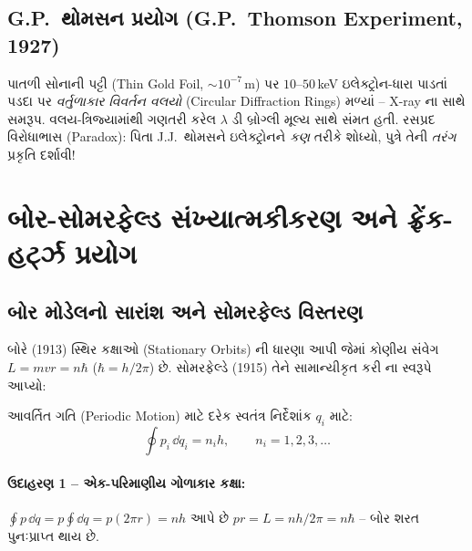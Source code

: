 \subsection{G.P.\ થોમસન પ્રયોગ (G.P.\ Thomson Experiment, 1927)}

પાતળી સોનાની પટ્ટી (Thin Gold Foil, $\sim10^{-7}\,$m) પર $10$--$50\,$keV ઇલેક્ટ્રોન-ધારા
પાડતાં પડદા પર \emph{વર્તુળાકાર વિવર્તન વલયો} (Circular Diffraction Rings) મળ્યાં -- X-ray ના
 સાથે સમરૂપ. વલય-ત્રિજ્યામાંથી ગણતરી કરેલ $\lambda$ ડી બ્રોગ્લી
મૂલ્ય સાથે સંમત હતી. રસપ્રદ વિરોધાભાસ (Paradox): પિતા J.J.\ થોમસને ઇલેક્ટ્રોનને \emph{કણ}
તરીકે શોધ્યો, પુત્રે તેની \emph{તરંગ} પ્રકૃતિ દર્શાવી!

\section{બોર-સોમરફેલ્ડ સંખ્યાત્મકીકરણ અને ફ્રેંક-હર્ટ્ઝ પ્રયોગ}

\subsection{બોર મોડેલનો સારાંશ અને સોમરફેલ્ડ વિસ્તરણ}

બોરે (1913) સ્થિર કક્ષાઓ (Stationary Orbits) ની ધારણા આપી જેમાં કોણીય સંવેગ
$L=mvr=n\hbar$ ($\hbar=h/2\pi$) છે. સોમરફેલ્ડે (1915) તેને સામાન્યીકૃત કરી
 ના સ્વરૂપે આપ્યો:

\begin{niyam}
આવર્તિત ગતિ (Periodic Motion) માટે દરેક સ્વતંત્ર નિર્દેશાંક $q_i$ માટે:
\begin{equation}
  \boxed{\;\oint p_i\,\dd q_i=n_i h,\qquad n_i=1,2,3,\dots\;}
\end{equation}
\end{niyam}

\paragraph{ઉદાહરણ 1 -- એક-પરિમાણીય ગોળાકાર કક્ષા:} $\oint p\,\dd q=p\oint \dd q=p(2\pi r)=nh$
આપે છે $pr=L=nh/2\pi=n\hbar$ -- બોર શરત પુનઃપ્રાપ્ત થાય છે.

